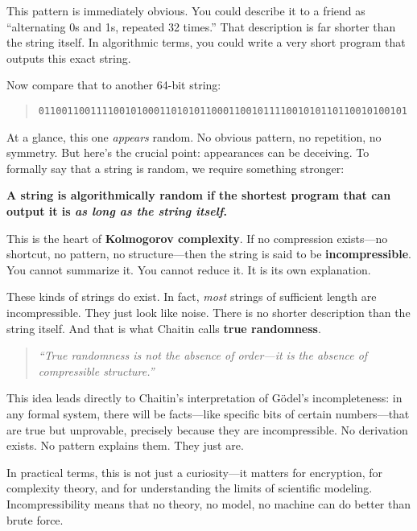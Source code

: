 This pattern is immediately obvious. You could describe it to a friend as ``alternating 0s and 1s, repeated 32 times.'' That description is far shorter than the string itself. In algorithmic terms, you could write a very short program that outputs this exact string.

Now compare that to another 64-bit string:

\begin{quote}
\texttt{0110011001111001010001101010110001100101111001010110110010100101}
\end{quote}

At a glance, this one \emph{appears} random. No obvious pattern, no repetition, no symmetry. But here’s the crucial point: appearances can be deceiving. To formally say that a string is random, we require something stronger:

\begin{center}
\textbf{A string is algorithmically random if the shortest program that can output it is \emph{as long as the string itself}.}
\end{center}

This is the heart of \textbf{Kolmogorov complexity}. If no compression exists—no shortcut, no pattern, no structure—then the string is said to be \textbf{incompressible}. You cannot summarize it. You cannot reduce it. It is its own explanation.

These kinds of strings do exist. In fact, \emph{most} strings of sufficient length are incompressible. They just look like noise. There is no shorter description than the string itself. And that is what Chaitin calls \textbf{true randomness}.

\medskip

\begin{quote}
\textit{“True randomness is not the absence of order—it is the absence of compressible structure.”}
\end{quote}

\medskip

This idea leads directly to Chaitin’s interpretation of Gödel’s incompleteness: in any formal system, there will be facts—like specific bits of certain numbers—that are true but unprovable, precisely because they are incompressible. No derivation exists. No pattern explains them. They just are.

In practical terms, this is not just a curiosity—it matters for encryption, for complexity theory, and for understanding the limits of scientific modeling. Incompressibility means that no theory, no model, no machine can do better than brute force.

